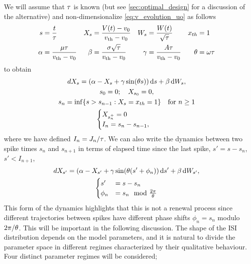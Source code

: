 We will assume that ${\tau}$ is known (but see \cref{sec:optimal_design} for a discussion
of the alternative) and non-dimensionalize \cref{eq:v_evolution_uo} as follows
\begin{align*}
s &= \frac{t}{{\tau}}	& 
X_s &= \frac{V(t) - v_0}{{ v_{\textrm{th} } } - v_0}&
W_s &= \frac{W(t)}{\sqrt {{\tau}}}	&
{ x_{th} }&= 1
\\
\alpha &= \frac{{\mu } {\tau}}{{ v_{\textrm{th} } } - v_0}	&
\beta &= \frac{\sigma\sqrt{{\tau}}}{{ v_{\textrm{th} } }-v_0}	&
{\gamma } &= \frac{A {\tau}}{ { v_{\textrm{th} } } - v_0 }	&
{ \theta} &= {\omega} {\tau} \notag
\end{align*}
to obtain
\begin{equation}
\begin{gathered}
dX_s = (\alpha - X_s + {\gamma } \sin( { \theta} s ) ) \, \mathrm{d} s + \beta \, \mathrm{d} W_s,
\\
s_0 = 0; \quad X_{s_0} = 0,
\\
s_{n } = \inf \{ s > s_{n-1} : X_s = { x_{th} } =1 \} \quad \text{for } n \geq 1 
\\
\begin{cases}
X_{s_n^+} = 0 &  
\\
I_n = s_n-s_{n-1} ,
\end{cases}
\end{gathered}
\label{eq:X_evolution_uo}
\end{equation}
where we have defined $I_n = J_n / {\tau}$. We can also write the dynamics between two spike times $s_n$ and $s_{n+1}$ in terms of elapsed time since
the last spike, $s' = s- s_n$, $s' < I_{n+1}$,
\begin{equation}
\begin{gathered}
dX_{s'} = (\alpha - X_{s'} + {\gamma } \sin( { \theta} (s' + \phi_n ) ) \, \mathrm{d} s' + \beta
\, \mathrm{d} W_{s'},
\\
\begin{cases}
s' &= s - s_n
\\
 \phi_n &= s_n \mod \tfrac{2 \pi}{{ \theta}}
\end{cases}
\end{gathered}
\label{eq:X_evolution_uo_renewal}
\end{equation}
This form of the dynamics highlights that this is not a renewal process since
different trajectories between spikes have different phase shifts $\phi_n = s_n$
modulo ${2 \pi}/{{ \theta}}$. This will be important in the following discussion. The
shape of the ISI distribution depends on the model parameters, and it is natural
to divide the parameter space in different regimes characterized by their
qualitative behaviour. Four distinct parameter regimes will be considered;
